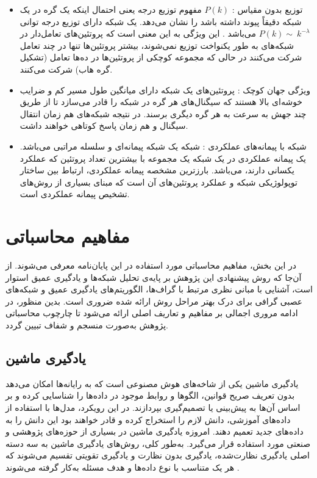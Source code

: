 \begin{itemize}
    \item توزیع بدون مقیاس : $P(k)$   مفهوم توزیع درجه یعنی احتمال اینکه یک گره در یک شبکه دقیقاً  پیوند داشته باشد را نشان می‌دهد. یک  شبکه  دارای توزیع درجه توانی $P(k)\sim\:k^{-\lambda}$ می‌باشد\cite{evolution} . این ویژگی به این معنی است که پروتئین‌های تعامل‌دار در شبکه‌های  به طور یکنواخت توزیع نمی‌شوند‌، بیشتر پروتئین‌ها تنها در چند تعامل شرکت می‌کنند در حالی که مجموعه کوچکی از پروتئین‌ها در ده‌ها تعامل (تشکیل گره هاب) شرکت می‌کنند. 
    \item ویژگی جهان کوچک : پروتئین‌های یک شبکه  دارای میانگین طول مسیر کم و ضرایب خوشه‌ای بالا هستند\cite{protein}  که سیگنال‌های هر گره در شبکه  را قادر می‌سازد تا از طریق چند جهش به سرعت به هر گره دیگری برسند. در نتیجه شبکه‌های  هم زمان انتقال سیگنال و هم زمان پاسخ کوتاهی خواهند داشت.
    \item شبکه با پیمانه‌های عملکردی : شبکه  یک شبکه پیمانه‌ای و سلسله مراتبی می‌باشد. یک پیمانه عملکردی در یک شبکه  یک مجموعه با بیشترین تعداد پروتئین که عملکرد یکسانی دارند، می‌باشد. بارزترین مشخصه پیمانه عملکردی، ارتباط بین ساختار توپولوژیکی شبکه  و عملکرد‌ پروتئین‌های آن است که مبنای بسیاری از روش‌های تشخیص پیمانه عملکردی است\cite{road}.
\end{itemize}


\section{مفاهیم محاسباتی}

در این بخش، مفاهیم محاسباتی مورد استفاده در این پایان‌نامه معرفی می‌شوند. از آن‌جا که روش پیشنهادی این پژوهش بر پایه‌ی تحلیل شبکه‌ها و یادگیری عمیق استوار است، آشنایی با مبانی نظری مرتبط با گراف‌ها، الگوریتم‌های یادگیری عمیق و شبکه‌های عصبی گرافی برای درک بهتر مراحل روش ارائه‌ شده ضروری است. بدین منظور، در ادامه مروری اجمالی بر مفاهیم و تعاریف اصلی ارائه می‌شود تا چارچوب محاسباتی پژوهش به‌صورت منسجم و شفاف تبیین گردد.

\subsection{یادگیری ماشین}
یادگیری ماشین یکی از شاخه‌های هوش مصنوعی است که به رایانه‌ها امکان می‌دهد بدون تعریف صریح قوانین، الگوها و روابط موجود در داده‌ها را شناسایی کرده و بر اساس آن‌ها به پیش‌بینی یا تصمیم‌گیری بپردازند. در این رویکرد، مدل‌ها با استفاده از داده‌های آموزشی، دانش لازم را استخراج کرده و قادر خواهند بود این دانش را به داده‌های جدید تعمیم دهند. امروزه یادگیری ماشین در بسیاری از حوزه‌های پژوهشی و صنعتی مورد استفاده قرار می‌گیرد. به‌طور کلی، روش‌های یادگیری ماشین به سه دسته‌ اصلی یادگیری نظارت‌شده، یادگیری بدون نظارت و یادگیری تقویتی تقسیم می‌شوند که هر یک متناسب با نوع داده‌ها و هدف مسئله به‌کار گرفته می‌شوند \cite{bishop2006pattern}.
